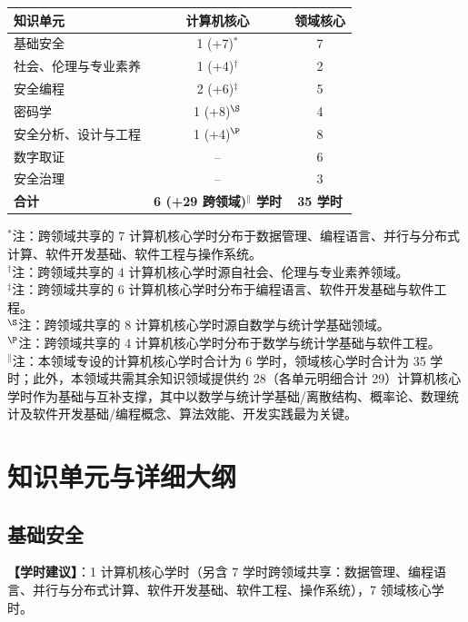\begin{table}[H]
\centering
\setlength{\tabcolsep}{3pt}\fontsize{8pt}{9.6pt}\selectfont\begin{tabularx}{\columnwidth}{Y c c}
\toprule
\textbf{知识单元} & \textbf{计算机核心} & \textbf{领域核心} \\
\midrule
基础安全 & 1 (+7)$^*$ & 7 \\
社会、伦理与专业素养 & 1 (+4)$^\dagger$ & 2 \\
安全编程 & 2 (+6)$^\ddagger$ & 5 \\
密码学 & 1 (+8)$^\S$ & 4 \\
安全分析、设计与工程 & 1 (+4)$^\P$ & 8 \\
数字取证 & -- & 6 \\
安全治理 & -- & 3 \\
\midrule
\textbf{合计} & \textbf{6 (+29 跨领域)$^\|$ 学时} & \textbf{35 学时} \\
\bottomrule
\end{tabularx}
\begin{flushleft}\footnotesize
$^*$注：跨领域共享的 7 计算机核心学时分布于数据管理、编程语言、并行与分布式计算、软件开发基础、软件工程与操作系统。\\
$^\dagger$注：跨领域共享的 4 计算机核心学时源自社会、伦理与专业素养领域。\\
$^\ddagger$注：跨领域共享的 6 计算机核心学时分布于编程语言、软件开发基础与软件工程。\\
$^\S$注：跨领域共享的 8 计算机核心学时源自数学与统计学基础领域。\\
$^\P$注：跨领域共享的 4 计算机核心学时分布于数学与统计学基础与软件工程。\\
$^\|$注：本领域专设的计算机核心学时合计为 6 学时，领域核心学时合计为 35 学时；此外，本领域共需其余知识领域提供约 28（各单元明细合计 29）计算机核心学时作为基础与互补支撑，其中以数学与统计学基础/离散结构、概率论、数理统计及软件开发基础/编程概念、算法效能、开发实践最为关键。
\end{flushleft}
\end{table}

\section{知识单元与详细大纲}

\subsection{基础安全}
\textbf{【学时建议】}：1 计算机核心学时（另含 7 学时跨领域共享：数据管理、编程语言、并行与分布式计算、软件开发基础、软件工程、操作系统），7 领域核心学时。

